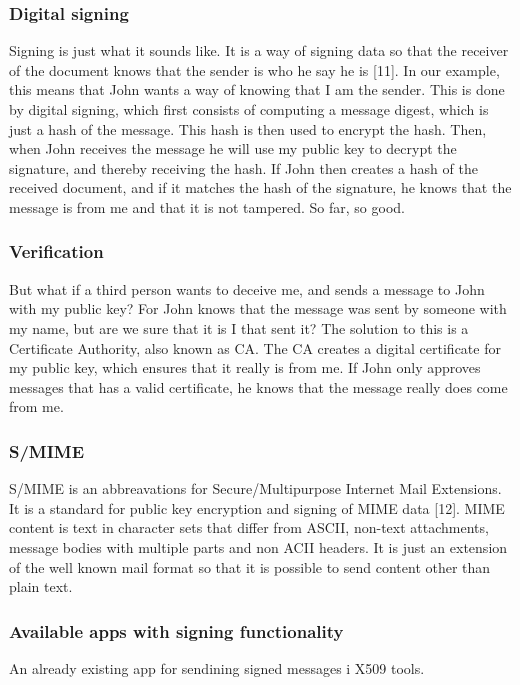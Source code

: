 \subsubsection{Digital signing}
Signing is just what it sounds like. It is a way of signing data so that the receiver of the document  knows that the sender is who he say he is [11]. In our example, this means that John wants a way of knowing that I am the sender. This is done by digital signing, which first consists of computing a message digest, which is just a hash of the message. This hash is then used to encrypt the hash. Then, when John receives the message he will use my public key to decrypt the signature, and thereby receiving the hash. If John then creates a hash of the received document, and if it matches the hash of the signature, he knows that the message is from me and that it is not tampered. So far, so good. 

\subsubsection{Verification}
But what if a third person wants to deceive me, and sends a message to John with my public key? For John knows that the message was sent by someone with my name, but are we sure that it is I that sent it? The solution to this is a Certificate Authority, also known as CA. The CA creates a digital certificate for my public key, which ensures that it really is from me. If John only approves messages that has a valid certificate, he knows that the message really does come from me.

\subsubsection{S/MIME}
S/MIME is an abbreavations for Secure/Multipurpose Internet Mail Extensions. It is a standard for public key encryption and signing of MIME data [12]. MIME content is text in character sets that differ from ASCII, non-text attachments, message bodies with multiple parts and non ACII headers. It is just an extension of the well known mail format so that it is possible to send content other than plain text.

\subsubsection{Available apps with signing functionality}
An already existing app for sendining signed messages i X509 tools.

